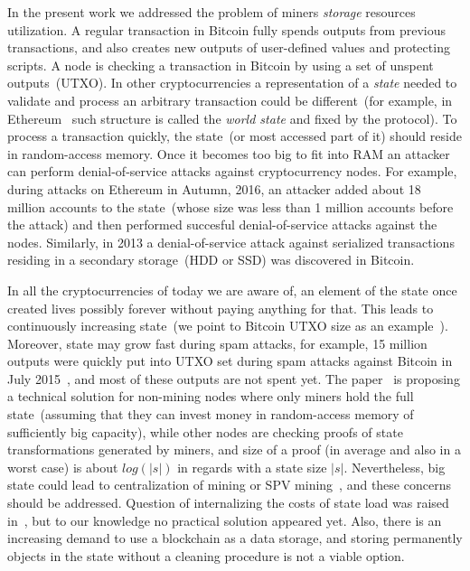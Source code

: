 \documentclass[]{llncs}   %
\begin{document}
In the present work we addressed the problem of miners {\em storage} resources utilization.
A regular transaction in Bitcoin fully spends outputs from previous transactions, and
also creates new outputs of user-defined values and protecting scripts.
A node is checking a transaction in
Bitcoin by using a set of unspent outputs~(UTXO). In other cryptocurrencies a
representation of a {\em state} needed to validate and process an arbitrary
transaction could be different~(for example, in Ethereum~\cite{ethyp} such
structure is called the {\em world state} and fixed by the protocol). To process
a transaction quickly, the state~(or most accessed part of it) should reside in
random-access memory. Once it becomes too big to fit into RAM an attacker can
perform denial-of-service attacks against cryptocurrency nodes. For example,
during attacks on Ethereum in Autumn, 2016, an attacker added about 18 million
accounts to the state~(whose size was less than 1 million accounts before the
attack) and then performed succesful denial-of-service attacks against the
nodes\cite{eth2016dos}. Similarly, in 2013 a denial-of-service attack against
serialized transactions residing in a secondary storage~(HDD or SSD) was
discovered in Bitcoin\cite{vasek2014empirical}.

In all the cryptocurrencies of today we are aware of, an element of the state once created 
lives possibly forever without paying anything for that. This leads to continuously increasing state~(we point
to Bitcoin UTXO size as an
example~\cite{utxoChart}). Moreover, state may grow fast during spam attacks, for
example, 15 million outputs were quickly put into UTXO set during spam attacks
against Bitcoin in July 2015~\cite{bitcoin2015flood}, and most of these outputs
are not spent yet. The paper~\cite{reyzin2016improving} is proposing a technical
solution for non-mining nodes where only miners hold the full state~(assuming
that they can invest money in random-access memory of sufficiently big
capacity), while other nodes are checking proofs of state transformations
generated by miners, and size of a proof (in average and also in a worst case)
is about $log(|s|)$ in regards with a state size $|s|$. Nevertheless, big state
could lead to centralization of mining or SPV mining~\cite{spvMining}, and these
concerns should be addressed. Question of internalizing the costs of
state load was raised in~\cite{Moeser2015}, but to our knowledge no
practical solution appeared yet. Also, there is an increasing demand to use a
blockchain as a data storage, and storing permanently objects in the state
without a cleaning procedure is not a viable option.
\end{document}
